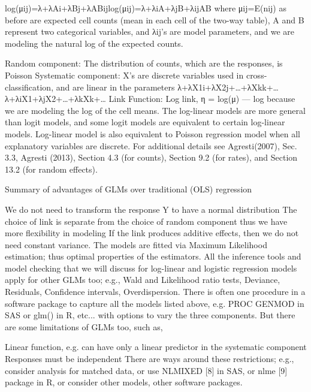 log(μij)=λ+λAi+λBj+λABijlog(μij)=λ+λiA+λjB+λijAB
where μij=E(nij) as before are expected cell counts (mean in each cell of the two-way table), A and B represent two categorical variables, and λij's are model parameters, and we are modeling the natural log of the expected counts.

Random component: The distribution of counts, which are the responses, is Poisson
Systematic component: X's are discrete variables used in cross-classification, and are linear in the parameters λ+λX1i+λX2j+…+λXkk+…λ+λiX1+λjX2+…+λkXk+…
Link Function: Log link, η = log(μ) --- log because we are modeling the log of the cell means.
The log-linear models are more general than logit models, and some logit models are equivalent to certain log-linear models. Log-linear model is also equivalent to Poisson regression model when all explanatory variables are discrete. For additional details see Agresti(2007), Sec. 3.3, Agresti (2013), Section 4.3 (for counts), Section 9.2 (for rates), and Section 13.2 (for random effects).

Summary of advantages of GLMs over traditional (OLS) regression

We do not need to transform the response Y to have a normal distribution
The choice of link is separate from the choice of random component thus we have more flexibility in modeling
If the link produces additive effects, then we do not need constant variance.
The models are fitted via Maximum Likelihood estimation; thus optimal properties of the estimators.
All the inference tools and model checking that we will discuss for log-linear and logistic regression models apply for other GLMs too; e.g., Wald and Likelihood ratio tests, Deviance, Residuals, Confidence intervals, Overdispersion.
There is often one procedure in a software package to capture all the models listed above, e.g. PROC GENMOD in SAS or glm() in R, etc... with options to vary the three components.
But there are some limitations of GLMs too, such as,

Linear function, e.g. can have only a linear predictor in the systematic component
Responses must be independent
There are ways around these restrictions; e.g., consider analysis for matched data, or use NLMIXED [8] in SAS, or {nlme} [9] package in R, or consider other models, other software packages.
